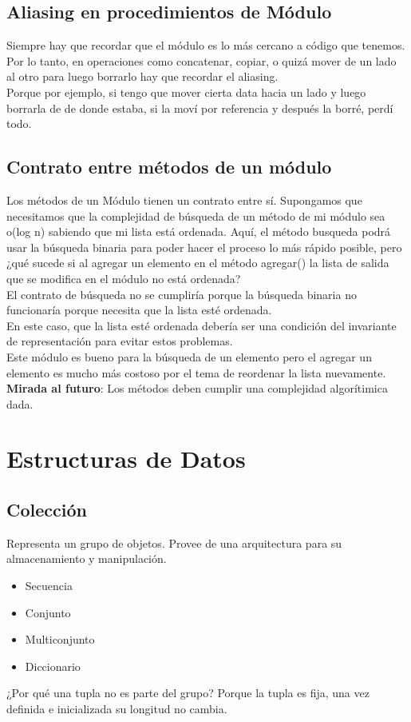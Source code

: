 \documentclass[10pt,a4paper]{article}
\begin{document}
\subsection*{Aliasing en procedimientos de Módulo}
Siempre hay que recordar que el módulo es lo más cercano a código que tenemos. Por lo tanto, en operaciones como concatenar, copiar, o quizá mover de un lado al otro para luego borrarlo hay que recordar el aliasing. \\
Porque por ejemplo, si tengo que mover cierta data hacia un lado y luego borrarla de de donde estaba, si la moví por referencia y después la borré, perdí todo. 

\subsection*{Contrato entre métodos de un módulo}
Los métodos de un Módulo tienen un contrato entre sí.
Supongamos que necesitamos que la complejidad de búsqueda de un método de mi módulo sea o(log n) sabiendo que mi lista está ordenada. Aquí, el método busqueda podrá usar la búsqueda binaria para poder hacer el proceso lo más rápido posible, pero ¿qué sucede si al agregar un elemento en el método agregar() la lista de salida que se modifica en el módulo no está ordenada? \\ El contrato de búsqueda no se cumpliría porque la búsqueda binaria no funcionaría porque necesita que la lista esté ordenada. \\

En este caso, que la lista esté ordenada debería ser una condición del invariante de representación para evitar estos problemas. \\

Este módulo es bueno para la búsqueda de un elemento pero el agregar un elemento es mucho más costoso por el tema de reordenar la lista nuevamente. \\

\textbf{Mirada al futuro}: Los métodos deben cumplir una complejidad algorítimica dada.
\section*{Estructuras de Datos}
\subsection*{Colección}
Representa un grupo de objetos. Provee de una arquitectura para su almacenamiento y manipulación.
\begin{itemize}
    \item Secuencia
    \item Conjunto
    \item Multiconjunto
    \item Diccionario
\end{itemize}
¿Por qué una tupla no es parte del grupo? Porque la tupla es fija, una vez definida e inicializada su longitud no cambia.
\end{document}
